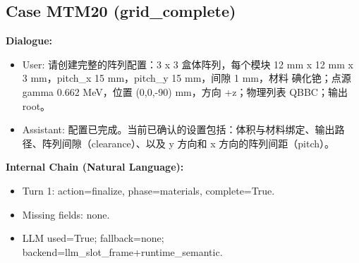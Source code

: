 \documentclass[11pt]{ctexart}
\begin{document}
\subsection{Case MTM20 (grid\_complete)}
\textbf{Dialogue:}
\begin{itemize}
\item User: 请创建完整的阵列配置：3 x 3 盒体阵列，每个模块 12 mm x 12 mm x 3 mm，pitch\_x 15 mm，pitch\_y 15 mm，间隙 1 mm，材料 碘化铯；点源 gamma 0.662 MeV，位置 (0,0,-90) mm，方向 +z；物理列表 QBBC；输出 root。
\item Assistant: 配置已完成。当前已确认的设置包括：体积与材料绑定、输出路径、阵列间隙（clearance）、以及 y 方向和 x 方向的阵列间距（pitch）。
\end{itemize}
\textbf{Internal Chain (Natural Language):}
\begin{itemize}
\item Turn 1: action=finalize, phase=materials, complete=True.
\item Missing fields: none.
\item LLM used=True; fallback=none; backend=llm\_slot\_frame+runtime\_semantic.
\end{itemize}
\end{document}
